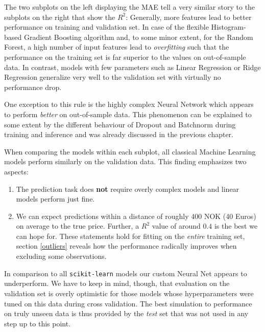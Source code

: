 \documentclass[12pt, letterpaper]{article}
\begin{document}
The two subplots on the left displaying the MAE tell a very similar story to the subplots on the right that show the $R^2$:
Generally, more features lead to better performance on training and validation set.
In case of the flexible Histogram-based Gradient Boosting algorithm and, to some minor extent, for the Random Forest, a high number of input features lead to \emph{overfitting} such that the performance on the training set is far superior to the values on out-of-sample data.
In contrast, models with few parameters such as Linear Regression or Ridge Regression generalize very well to the validation set with virtually no performance drop.

One exception to this rule is the highly complex Neural Network which appears to perform \emph{better} on out-of-sample data.
This phenomenon can be explained to some extent by the different behaviour of Dropout and Batchnorm during training and inference and was already discussed in the previous chapter.

When comparing the models within each subplot, all classical Machine Learning models perform similarly on the validation data.
This finding emphasizes two aspects:
\begin{enumerate}
    \item The prediction task does \textbf{not} require overly complex models and linear models perform just fine.
    \item We can expect predictions within a distance of roughly $400$ NOK (40 Euros) on average to the true price.
          Further, a $R^2$ value of around $0.4$ is the best we can hope for.
          These statements hold for fitting on the \emph{entire} training set, section \ref{outliers} reveals how the performance radically improves when excluding some observations.
\end{enumerate}
In comparison to all \texttt{scikit-learn} models our custom Neural Net appears to underperform.
We have to keep in mind, though, that evaluation on the validation set is overly optimistic for those models whose hyperparameters were tuned on this data during cross validation.
The best simulation to performance on truly unseen data is thus provided by the \emph{test} set that was not used in any step up to this point.
\end{document}
